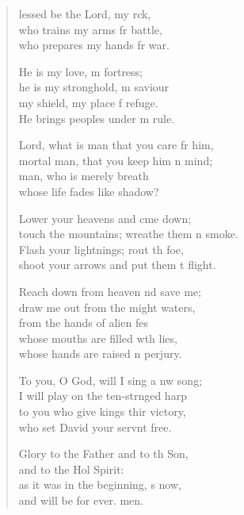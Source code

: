 \begin{verse}
  \begin{patverse}
lessed be the Lord, my rck,\Flex\\
who trains my arms fr battle,\Med\\
who prepares my hands fr war.

He is my love, m fortress;\Med\\
he is my stronghold, m saviour\\
my shield, my place f refuge.\Med\\
He brings peoples under m rule.

Lord, what is man that you care fr him,\Med\\
mortal man, that you keep him \pointup{\i}n mind;\\
man, who is merely  breath\Med\\
whose life fades like  shadow?

Lower your heavens and cme down;\Med\\
touch the mountains; wreathe them \pointup{\i}n smoke.\\
Flash your lightnings; rout th foe,\Med\\
shoot your arrows and put them t flight.

Reach down from heaven nd save me;\Med\\
draw me out from the might waters,\\
from the hands of alien fes\Flex\\
whose mouths are filled w\pointup{\i}th lies,\Med\\
whose hands are raised \pointup{\i}n perjury.

To you, O God, will I sing a nw song;\Med\\
I will play on the ten-str\pointup{\i}nged harp\\
to you who give kings thir victory,\Med\\
who set David your servnt free.

Glory to the Father and to th Son,\Med\\
and to the Hol Spirit:\\
as it was in the beginning, \pointup{\i}s now,\Med\\
and will be for ever. men.
  \end{patverse}
\end{verse}
